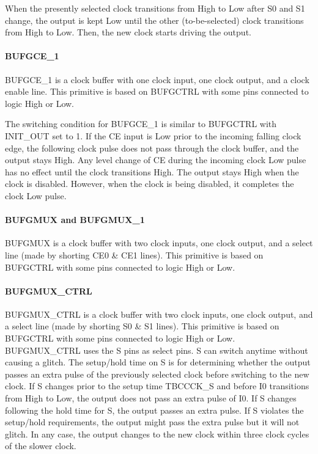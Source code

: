 \documentclass[12pt, a4paper]{report}
\begin{document}
    When the presently selected clock transitions from High to Low after S0 and S1 change, the output is kept Low until the other (to-be-selected) clock transitions from High to Low. Then, the new clock starts driving the output.

    \paragraph{BUFGCE\_1}
    BUFGCE\_1 is a clock buffer with one clock input, one clock output, and a clock enable line. This primitive is based on BUFGCTRL with some pins connected to logic High or Low.

    The switching condition for BUFGCE\_1 is similar to BUFGCTRL with INIT\_OUT set to 1. If the CE input is Low prior to the incoming falling clock edge, the following clock pulse does not
    pass through the clock buffer, and the output stays High. Any level change of CE during the incoming clock Low pulse has no effect until the clock transitions High. The output stays  High when the clock is disabled. However, when the clock is being disabled, it completes
    the clock Low pulse.
 
    \paragraph{BUFGMUX and BUFGMUX\_1}
    BUFGMUX is a clock buffer with two clock inputs, one clock output, and a select line (made by shorting CE0 \& CE1 lines). This primitive is based on BUFGCTRL with some pins connected to logic High or Low.

    \paragraph{BUFGMUX\_CTRL}
    BUFGMUX\_CTRL is a clock buffer with two clock inputs, one clock output, and a select line (made by shorting S0 \& S1 lines). This primitive is based on BUFGCTRL with some pins connected to logic High or Low. BUFGMUX\_CTRL uses the S pins as select pins. S can switch anytime without causing a
    glitch. The setup/hold time on S is for determining whether the output passes an extra pulse of the previously selected clock before switching to the new clock. If S changes prior to the setup time TBCCCK\_S and before I0 transitions from High
    to Low, the output does not pass an extra pulse of I0. If S changes following the hold time
    for S, the output passes an extra pulse. If S violates the setup/hold requirements, the output
    might pass the extra pulse but it will not glitch. In any case, the output changes to the new
    clock within three clock cycles of the slower clock.
\end{document}
